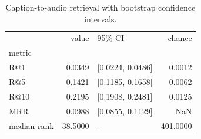 \begin{table}[t]
\caption{Caption-to-audio retrieval with bootstrap confidence intervals.}
\label{tab:retci}
\begin{tabular}{lrlr}
\toprule
 & value & 95\% CI & chance \\
metric &  &  &  \\
\midrule
R@1 & 0.0349 & [0.0224, 0.0486] & 0.0012 \\
R@5 & 0.1421 & [0.1185, 0.1658] & 0.0062 \\
R@10 & 0.2195 & [0.1908, 0.2481] & 0.0125 \\
MRR & 0.0988 & [0.0855, 0.1129] & NaN \\
median rank & 38.5000 & - & 401.0000 \\
\bottomrule
\end{tabular}
\end{table}
